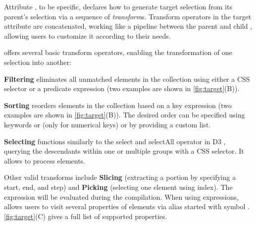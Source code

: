 
Attribute , to be specific, declares how to generate target selection from its parent's selection via a sequence of \textit{transform}s.
Transform operators in the target attribute are concatenated, working like a pipeline between the parent and child \aniunit{}, allowing users to customize it according to their needs.


\gaia{} offers several basic transform operators, enabling the transformation of one selection into another:

\squishlist

\item \textbf{Filtering}
eliminates all unmatched elements in the collection using either a CSS selector or a predicate expression (two examples are shown in \autoref{fig:target}(B)).

\item \textbf{Sorting}
reorders elements in the collection based on a key expression (two examples are shown in \autoref{fig:target}(B)).
The desired order can be specified using keywords  or  (only for numerical keys) or by providing a custom list.

\item \textbf{Selecting}
functions similarly to the select and selectAll operator in D3 \cite{bostock2011d3}, querying the descendants within one or multiple groups with a CSS selector.
It allows \gaia{} to process  elements.


\squishend

Other valid transforms include \textbf{Slicing} (extracting a portion by specifying a start, end, and step) and \textbf{Picking} (selecting one element using index).
The expression will be evaluated during the compilation.
When using expressions, \gaia{} allows users to visit several properties of elements via alias started with symbol .
\autoref{fig:target}(C) gives a full list of supported properties.


